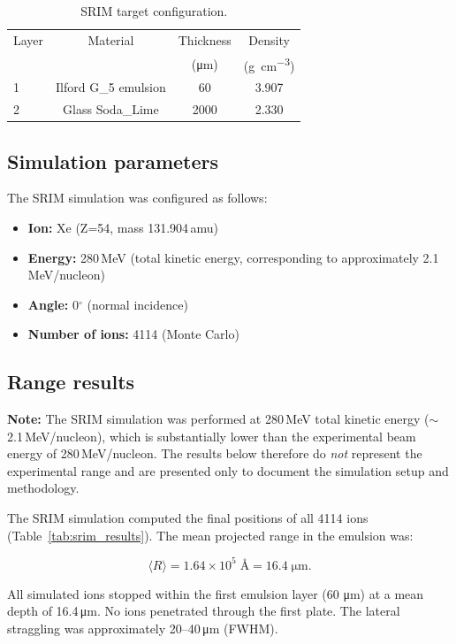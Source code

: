 \documentclass[12pt,a4paper]{article}
\begin{document}
\begin{table}[H]
\centering
\caption{SRIM target configuration.}
\label{tab:srim_target}
\begin{tabular}{lccc}
\toprule
Layer & Material & Thickness & Density \\
 & & (\si{\micro\meter}) & (\si{\g\per\cm\cubed}) \\
\midrule
1 & Ilford G\_5 emulsion & 60 & 3.907 \\
2 & Glass Soda\_Lime & 2000 & 2.330 \\
\bottomrule
\end{tabular}
\end{table}

\subsection{Simulation parameters}

The SRIM simulation was configured as follows:

\begin{itemize}
  \item \textbf{Ion:} Xe (Z=54, mass 131.904\,amu)
  \item \textbf{Energy:} 280\,MeV (total kinetic energy,
        corresponding to approximately 2.1\,MeV/nucleon)
  \item \textbf{Angle:} 0$^\circ$ (normal incidence)
  \item \textbf{Number of ions:} 4114 (Monte Carlo)
\end{itemize}

\subsection{Range results}

\noindent\textbf{Note:} The SRIM simulation was performed at
280\,MeV total kinetic energy ($\sim$2.1\,MeV/nucleon), which is
substantially lower than the experimental beam energy of
280\,MeV/nucleon. The results below therefore do \emph{not} represent
the experimental range and are presented only to document the
simulation setup and methodology.

The SRIM simulation computed the final positions of all 4114 ions
(Table~\ref{tab:srim_results}). The mean projected range in the
emulsion was:

\[
\langle R \rangle = 1.64 \times 10^5\;\text{\AA}
= 16.4\;\si{\micro\meter}.
\]

All simulated ions stopped within the first emulsion layer (60
\si{\micro\meter}) at a mean depth of 16.4\,\si{\micro\meter}. No ions
penetrated through the first plate. The lateral straggling was
approximately 20--40\,\si{\micro\meter} (FWHM).
\end{document}
